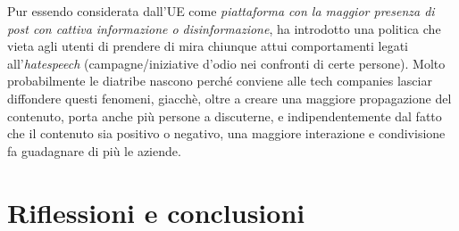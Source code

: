 \documentclass{article}
\begin{document}
\begin{justify}
    Pur essendo considerata dall'UE come \textit{piattaforma con la maggior presenza di post con cattiva informazione o disinformazione}, ha introdotto una politica che vieta agli utenti di prendere di mira chiunque attui comportamenti legati all'\textit{hatespeech} (campagne/iniziative d'odio nei confronti di certe persone).
    Molto probabilmente le diatribe nascono perché conviene alle tech companies lasciar diffondere questi fenomeni, giacchè, oltre a creare una maggiore propagazione del contenuto, porta anche più persone a discuterne, e indipendentemente dal fatto che il contenuto sia positivo o negativo, una maggiore interazione e condivisione fa guadagnare di più le aziende.
\end{justify}

\centering
\newpage\section{Riflessioni e conclusioni}
\end{document}
